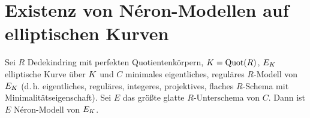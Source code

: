 \documentclass[german]{scrreprt}
\begin{document}


\chapter{Existenz von Néron-Modellen auf elliptischen Kurven}
\begin{Satz}\label{thm:exneronmodelle}

  Sei $R$ Dedekindring mit perfekten Quotientenkörpern,
  $K=\operatorname{Quot}(R)$, $E_{K}$ elliptische Kurve über $K$ und $C$ minimales
  eigentliches, reguläres $R$-Modell von $E_{K}$
  (d.\,h. eigentliches, reguläres, integeres, projektives,
  flaches $R$-Schema mit Minimalitätseigenschaft).
  Sei $E$ das größte glatte $R$-Unterschema von $C$.
  Dann ist $E$ Néron-Modell von $E_{K}$.


\end{Satz}
\end{document}
